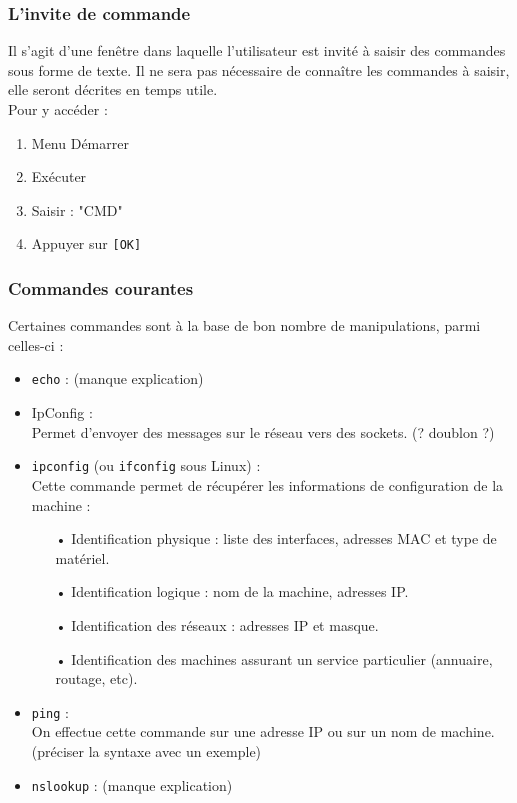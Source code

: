 \documentclass[a4paper]{article}
\begin{document}
\subsubsection{L'invite de commande}
Il s'agit d'une fenêtre dans laquelle l'utilisateur est invité à saisir des commandes sous forme de texte.
Il ne sera pas nécessaire de connaître les commandes à saisir, elle seront décrites en temps utile.\\
Pour y accéder :
\begin{enumerate}
	\item Menu Démarrer
	\item Exécuter
	\item Saisir : "CMD"
	\item Appuyer sur \verb![OK]!
\end{enumerate}
\subsubsection{Commandes courantes}
Certaines commandes sont à la base de bon nombre de manipulations, parmi celles-ci : 
	\begin{itemize}
	\item \texttt{echo} : (manque explication)\\
	
	\item IpConfig : \\
	Permet d'envoyer des messages sur le réseau vers des sockets. (? doublon ?)
	
	\item \texttt{ipconfig} (ou \texttt{ifconfig} sous Linux) : \\
	Cette commande permet de récupérer les informations de configuration de la machine : \\
		\begin{itemize}
		\item[•]Identification physique : liste des interfaces, adresses MAC et type de matériel.
		\item[•]Identification logique : nom de la machine, adresses IP.
		\item[•]Identification des réseaux : adresses IP et masque.
		\item[•]Identification des machines assurant un service particulier (annuaire, routage, etc).
		\end{itemize}
		
	\item \texttt{ping} : \\
	On effectue cette commande sur une adresse IP ou sur un nom de machine. (préciser la syntaxe avec un exemple) 
	
	\item \texttt{nslookup} : (manque explication)
	
	\end{itemize}
\end{document}
